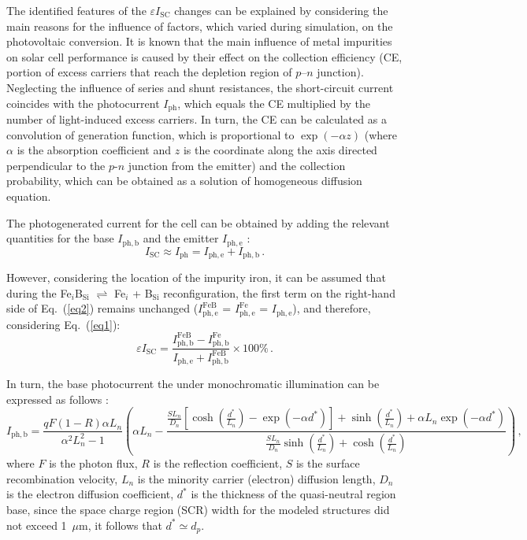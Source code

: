 \documentclass[a4paper,fleqn]{cas-sc}
\begin{document}
The identified features of the $\varepsilon I_\mathrm{SC}$ changes can be explained by considering
the main reasons for the influence of factors, which varied during simulation, on the photovoltaic conversion.
It is known \cite{YangHandbookPVSi} that the main influence of metal impurities on solar cell performance is caused
by their effect on the collection efficiency (CE, portion of excess carriers that reach the depletion region of $p$–$n$ junction).
Neglecting the influence of series and shunt resistances, the short-circuit current coincides with the photocurrent $I_\mathrm{ph}$,
which equals the CE multiplied by the number of light-induced excess carriers.
In turn, the CE can be calculated as a convolution of generation function, which is proportional to $\exp(-\alpha z)$
(where $\alpha$ is the absorption coefficient and $z$ is the coordinate along the axis directed
perpendicular to the $p$-$n$ junction from the emitter)
and the collection probability, which can be obtained as a solution of homogeneous diffusion equation.

The photogenerated current for the cell can be obtained by adding the relevant quantities
for the base $I_\mathrm{ph,b}$ and the emitter $I_\mathrm{ph,e}$ \cite{Markvart}:
\begin{equation}
\label{eq2}
     I_\mathrm{SC} \approx I_\mathrm{ph} = I_\mathrm{ph,e} + I_\mathrm{ph,b}\,.
\end{equation}


However, considering the location of the impurity iron,
it can be assumed that during the Fe$_i$B$_\mathrm{Si}$ $\rightleftharpoons$ Fe$_i$ + B$_\mathrm{Si}$ reconfiguration,
the first term on the right-hand side of Eq.~(\ref{eq2})
remains unchanged ($I_\mathrm{ph,e}^\mathrm{FeB}$ = $I_\mathrm{ph,e}^\mathrm{Fe}$ = $I_\mathrm{ph,e}$),
and therefore, considering Eq.~(\ref{eq1}):
\begin{equation}
\label{eq3}
     \varepsilon I_\mathrm{SC} = \frac{I_\mathrm{ph,b}^\mathrm{FeB}-I_\mathrm{ph,b}^\mathrm{Fe}}{I_\mathrm{ph,e}+I_\mathrm{ph,b}^\mathrm{FeB}}\times 100 \%\,.
\end{equation}

In turn, the base photocurrent the under monochromatic illumination can be expressed  as follows \cite{Goetzberger1998}:
\begin{equation}
\label{eq4}
     I_\mathrm{ph,b}=\frac{qF(1-R)\alpha L_n}{{\alpha}^2 L_n^2 - 1}\left( \alpha L_n - \frac{\frac{SL_n}{D_n}\left[ {\cosh\left( \frac{d^*}{L_n} \right)} - \exp(-\alpha d^*) \right] + \sinh\left( \frac{d^*}{L_n} \right) + \alpha L_n \exp(-\alpha d^*)}{\frac{SL_n}{D_n}\sinh\left( \frac{d^*}{L_n} \right) + \cosh\left( \frac{d^*}{L_n} \right)} \right)\,,
\end{equation}
where
$F$ is the photon flux,
$R$ is the reflection coefficient,
$S$ is the surface recombination velocity,
$L_n$ is the minority carrier (electron) diffusion length,
$D_n$ is the electron diffusion coefficient,
$d^*$ is the thickness of the quasi-neutral region base,
since the space charge region (SCR) width for the modeled structures did not exceed 1~$\mu$m,
it follows that $d^*\simeq d_p$.
\end{document}
